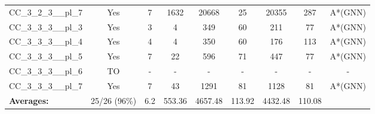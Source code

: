 \documentclass{article}
\begin{document}
\begin{tabular}{lcccccccc}
CC\_3\_2\_3\_\_pl\_7 & Yes & 7 & 1632 & 20668 & 25 & 20355 & 287 & A*(GNN) \\
CC\_3\_3\_3\_\_pl\_3 & Yes & 3 & 4 & 349 & 60 & 211 & 77 & A*(GNN) \\
CC\_3\_3\_3\_\_pl\_4 & Yes & 4 & 4 & 350 & 60 & 176 & 113 & A*(GNN) \\
CC\_3\_3\_3\_\_pl\_5 & Yes & 7 & 22 & 596 & 71 & 447 & 77 & A*(GNN) \\
CC\_3\_3\_3\_\_pl\_6 & TO & - & - & - & - & - & - & - \\
CC\_3\_3\_3\_\_pl\_7 & Yes & 7 & 43 & 1291 & 81 & 1128 & 81 & A*(GNN) \\
\textbf{Averages:} & 25/26 (96\%) & 6.2 & 553.36 & 4657.48 & 113.92 & 4432.48 & 110.08 & \\
\bottomrule
\end{tabular}
\\[0.7cm]
\end{document}
